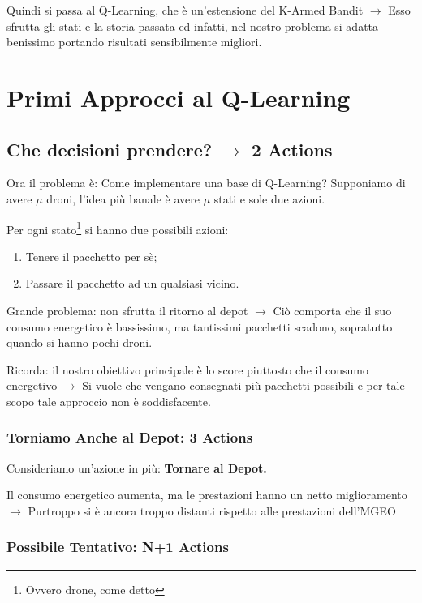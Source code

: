 \documentclass[12pt]{article}
\begin{document}
Quindi si passa al Q-Learning, che è un'estensione del K-Armed Bandit $\rightarrow$ Esso sfrutta gli stati e la storia passata ed infatti, nel nostro problema si adatta benissimo portando risultati sensibilmente migliori.

\section{Primi Approcci al Q-Learning}

\subsection{Che decisioni prendere? $\rightarrow$ 2 Actions}


Ora il problema è: Come implementare una base di Q-Learning? Supponiamo di avere $\mu$ droni, l'idea più banale è avere $\mu$ stati e sole due azioni. 

Per ogni stato\footnote{Ovvero drone, come detto} si hanno due possibili azioni:

\begin{enumerate}

    \item Tenere il pacchetto per sè;
    
    \item Passare il pacchetto ad un qualsiasi vicino.
    
\end{enumerate}

Grande problema: non sfrutta il ritorno al depot $\rightarrow$ Ciò comporta che il suo consumo energetico è bassissimo, ma tantissimi pacchetti scadono, sopratutto quando si hanno pochi droni. 

Ricorda: il nostro obiettivo principale è lo score piuttosto che il consumo energetivo $\rightarrow$ Si vuole che vengano consegnati più pacchetti possibili e per tale scopo tale approccio non è soddisfacente.

\subsubsection{Torniamo Anche al Depot: 3 Actions}

Consideriamo un'azione in più: \textbf{Tornare al Depot.}

Il consumo energetico aumenta, ma le prestazioni hanno un netto miglioramento $\rightarrow$ Purtroppo si è ancora troppo distanti rispetto alle prestazioni dell'MGEO

\subsubsection{Possibile Tentativo: N+1 Actions}
\end{document}
